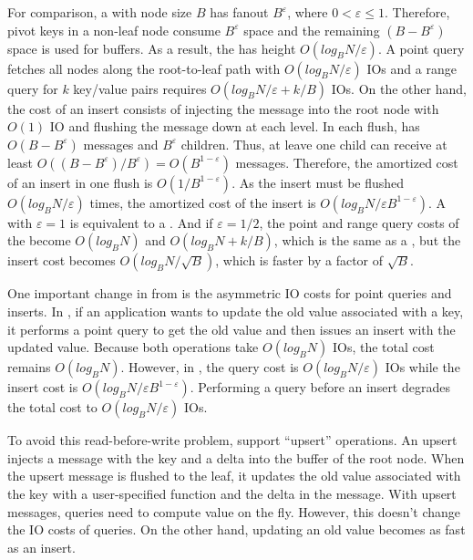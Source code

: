 For comparison, a \bet with node size $B$ has fanout $B^{\varepsilon}$, where
$0 < \varepsilon \leq 1$.
Therefore, pivot keys in a non-leaf node consume $B^{\varepsilon}$ space and
the remaining $(B - B^{\varepsilon})$ space is used for buffers.
As a result, the \bet has height $O(log_{B}{N}/\varepsilon)$.
A point query fetches all nodes along the root-to-leaf path with
$O(log_{B}{N}/\varepsilon)$ IOs and a range query for $k$ key/value pairs
requires $O({log_{B}{N}}/{\varepsilon} + k/B)$ IOs.
On the other hand, the cost of an insert consists of injecting the message into
the root node with $O(1)$ IO and flushing the message down at each level.
In each flush, \bets has $O(B - B^{\varepsilon})$ messages and $B^{\varepsilon}$
children.
Thus, at leave one child can receive at least
$O((B - B^{\varepsilon})/B^{\varepsilon}) = O(B^{1 - \varepsilon})$ messages.
Therefore, the amortized cost of an insert in one flush is
$O(1/B^{1 - \varepsilon})$.
As the insert must be flushed $O(log_{B}{N}/\varepsilon)$ times, the amortized
cost of the insert is $O({log_{B}{N}}/{\varepsilon B^{1 - \varepsilon}})$.
A \bet with $\varepsilon = 1$ is equivalent to a \btree.
And if $\varepsilon = 1/2$, the point and range query costs of the \bet
become $O(log_{B}{N})$ and $O(log_{B}{N} + k/B)$, which is the same as a \btree,
but the insert cost becomes $O(log_{B}{N}/{\sqrt{B}})$, which is faster by a
factor of $\sqrt{B}$.

One important change in \bets from \btrees is the asymmetric IO costs for
point queries and inserts.
In \btrees, if an application wants to update the old value associated with a
key, it performs a point query to get the old value and then issues an insert
with the updated value.
Because both operations take $O(log_{B}{N})$ IOs, the total cost remains
$O(log_{B}{N})$.
However, in \bets, the query cost is $O(log_{B}{N}/\varepsilon)$ IOs while the
insert cost is $O({log_{B}{N}}/{\varepsilon B^{1 - \varepsilon}})$.
Performing a query before an insert degrades the total cost to
$O(log_{B}{N}/\varepsilon)$ IOs.

To avoid this read-before-write problem, \bets support ``upsert'' operations.
An upsert injects a message with the key and a delta into the buffer of the root
node.
When the upsert message is flushed to the leaf, it updates the old value
associated with the key with a user-specified function and the delta in the
message.
With upsert messages, queries need to compute value on the fly.
However, this doesn't change the IO costs of queries.
On the other hand, updating an old value becomes as fast as an insert.

